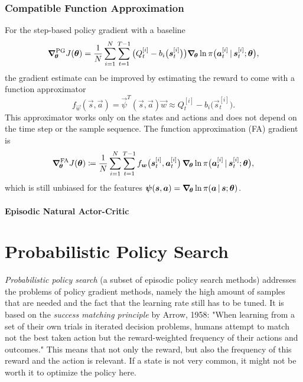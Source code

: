 			\subsubsection{Compatible Function Approximation} %
				\label{subsubsec:compatibleFunctionApproximation}

				For the step-based policy gradient with a baseline
				\begin{equation*}
					\grad_{\!\bm{\theta}}^\mathrm{PG} J(\bm{\theta})
					= \frac{1}{N} \sum_{i = 1}^{N} \sum_{t = 1}^{T - 1} \big(Q_t^{[i]} - b_i\big(\bm{s}_t^{[i]}\big)\big) \grad_{\!\bm{\theta}} \ln \pi\big(\bm{a}_t^{[i]} \,\vert\, \bm{s}_t^{[i]}; \bm{\theta}\big),
				\end{equation*}
				the gradient estimate can be improved by estimating the reward to come with a function approximator
				\begin{equation*}
					f_{\vec{w}}(\vec{s}, \vec{a}) = \vec{\psi}^T(\vec{s}, \vec{a}) \vec{w} \approx Q_t^{[i]} - b_i\big(\vec{s}_t^{[i]}\big).
				\end{equation*}
				This approximator works only on the states and actions and does not depend on the time step or the sample sequence. The function approximation (FA) gradient is
				\begin{equation*}
					\grad_{\!\bm{\theta}}^\mathrm{FA} J(\bm{\theta})
					\coloneqq \frac{1}{N} \sum_{i = 1}^{N} \sum_{t = 1}^{T - 1} f_{\bm{w}}\big( \bm{s}_t^{[i]}, \bm{a}_t^{[i]} \big) \, \grad_{\!\bm{\theta}} \ln \pi\big(\bm{a}_t^{[i]} \,\vert\, \bm{s}_t^{[i]}; \bm{\theta}\big),
				\end{equation*}
				which is still unbiased for the features \( \bm{\psi}(\bm{s}, \bm{a}) = \grad_{\!\bm{\theta}} \ln \pi(\bm{a} \,\vert\, \bm{s}; \bm{\theta}) \).


				\paragraph{Episodic Natural Actor-Critic} %

	\section{Probabilistic Policy Search}
		\emph{Probabilistic policy search} (a subset of episodic policy search methods) addresses the problems of policy gradient methods, namely the high amount of samples that are needed and the fact that the learning rate still has to be tuned. It is based on the \emph{success matching principle} by Arrow, 1958: "When learning from a set of their own trials in iterated decision problems, humans attempt to match not the best taken action but the reward-weighted frequency of their actions and outcomes." This means that not only the reward, but also the frequency of this reward and the action is relevant. If a state is not very common, it might not be worth it to optimize the policy here.

